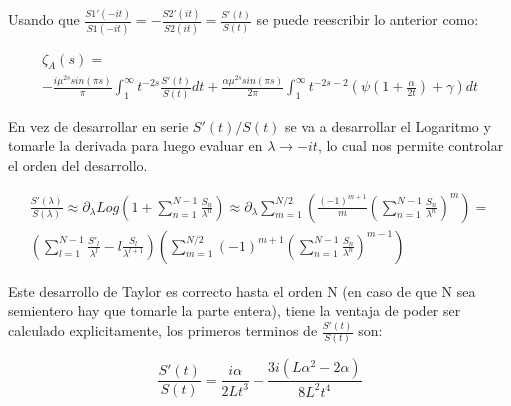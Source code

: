 Usando que $\frac{S1' (-it)}{S1 (-i t)} = - \frac{S2 ' (i t)}{S2(it)} = \frac{S'(t)}{S(t)}  $ se puede reescribir lo anterior como:

\begin{equation}
\begin{array}{c}
\zeta _A (s) =  \\ [5pt]
-  \frac{i \mu ^{2s}  sin (\pi s)}{\pi} \int _1 ^{\infty} t ^{-2s} \frac{S'(t)}{S(t)} dt + 
\frac{\alpha \mu ^{2s} sin( \pi s )}{2 \pi } \int _{1} ^{\infty} 
t ^{-2s-2} \left( \psi (1 + \frac{\alpha}{2 t}) + \gamma \right) dt
\end{array}
\end{equation}



En vez de desarrollar en serie $S'(t) / S (t)$ se va a desarrollar el Logaritmo y tomarle la derivada para luego evaluar en $\lambda \rightarrow -i t$, lo cual nos permite controlar el orden del desarrollo.

\begin{equation}
\begin{array}{c}

\frac{S'( \lambda)}{S( \lambda )} \approx 
\partial _{\lambda} Log \left(
								1 + \sum _{n=1} ^{N-1}  \frac{S _n}{\lambda ^n}
								\right) \approx 
\partial _{\lambda} 
	
\sum _{m = 1} ^{N/2} 
	\left(
	\frac{(-1) ^{m+1} }{m}
	\left(
		\sum _{n=1} ^{N-1} \frac{S _n}{\lambda ^n}
		\right) ^m 
	\right) = \\ [10pt]
	
\left(								
	\sum _{l = 1} ^{N-1} 
	\frac{S' _l}{\lambda ^l} - l \frac{S _l}{\lambda ^{l+1}}
	\right)							

\left(
	\sum _{m = 1} ^{N/2} (-1) ^{m+1} 


	\left(
			\sum _{n=1} ^{N-1} \frac{S _n}{\lambda ^n}
			\right) ^{m-1}
			
	\right)


	
\end{array}	
\end{equation}



Este desarrollo de Taylor es correcto hasta el orden N (en caso de que N sea semientero hay que tomarle la parte entera), tiene la ventaja de poder ser calculado explicitamente, los primeros terminos de $\frac{S'(t)}{S(t)}$ son:

\begin{equation}
\frac{S'(t)}{S(t)} = 
\frac{i \alpha}{2 L t^3} -
\frac{3 i (L \alpha ^2 - 2 \alpha)}{8 L^2 t ^4}
\end{equation}




